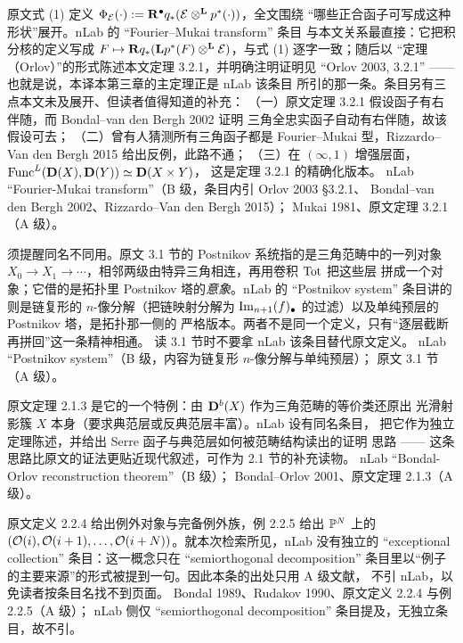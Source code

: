 \begin{conceptlist}
%
{原文式 (1) 定义 $\Phi_{\mathcal{E}}(\cdot):=\mathbf{R}^{\bullet} q_*(\mathcal{E}\otimes^{\mathbf{L}} p^*(\cdot))$，全文围绕
“哪些正合函子可写成这种形状”展开。nLab 的 “Fourier--Mukai transform” 条目
与本文关系最直接：它把积分核的定义写成
$F\mapsto \mathbf{R} q_*(\mathbf{L} p^*(F)\otimes^{\mathbf{L}} \mathcal{E})$，与式 (1) 逐字一致；随后以
“定理（Orlov）”的形式陈述本文定理 3.2.1，并明确注明证明见
“Orlov 2003, 3.2.1” —— 也就是说，本译本第三章的主定理正是 nLab 该条目
所引的那一条。条目另有三点本文未及展开、但读者值得知道的补充：
（一）原文定理 3.2.1 假设函子有右伴随，而 Bondal--van den Bergh 2002 证明
三角全忠实函子自动有右伴随，故该假设可去；
（二）曾有人猜测所有三角函子都是 Fourier--Mukai 型，Rizzardo--Van den Bergh
2015 给出反例，此路不通；
（三）在 $(\infty,1)$ 增强层面，$\mathrm{Func}^L(\mathbf{D}(X),\mathbf{D}(Y))\simeq \mathbf{D}(X\times Y)$，
这是定理 3.2.1 的精确化版本。}%
{nLab “Fourier-Mukai transform”（B 级，条目内引 Orlov 2003 §3.2.1、
Bondal--van den Bergh 2002、Rizzardo--Van den Bergh 2015）；
Mukai 1981、原文定理 3.2.1（A 级）。}

%
{须提醒同名不同用。原文 3.1 节的 Postnikov 系统指的是三角范畴中的一列对象
$X_0\to X_1\to\cdots$，相邻两级由特异三角相连，再用卷积 $\operatorname{Tot}$ 把这些层
拼成一个对象；它借的是拓扑里 Postnikov 塔的\emph{意象}。nLab 的
“Postnikov system” 条目讲的则是链复形的 $n$-像分解（把链映射分解为
$\operatorname{Im}_{n+1}(f)_\bullet$ 的过滤）以及单纯预层的 Postnikov 塔，是拓扑那一侧的
严格版本。两者不是同一个定义，只有“逐层截断再拼回”这一条精神相通。
读 3.1 节时不要拿 nLab 该条目替代原文定义。}%
{nLab “Postnikov system”（B 级，内容为链复形 $n$-像分解与单纯预层）；
原文 3.1 节（A 级）。}

%
{原文定理 2.1.3 是它的一个特例：由 $\mathbf{D}^{b}(X)$ 作为三角范畴的等价类还原出
光滑射影簇 $X$ 本身（要求典范层或反典范层丰富）。nLab 设有同名条目，
把它作为独立定理陈述，并给出 Serre 函子与典范层如何被范畴结构读出的证明
思路 —— 这条思路比原文的证法更贴近现代叙述，可作为 2.1 节的补充读物。}%
{nLab “Bondal-Orlov reconstruction theorem”（B 级）；
Bondal--Orlov 2001、原文定理 2.1.3（A 级）。}

%
{原文定义 2.2.4 给出例外对象与完备例外族，例 2.2.5 给出 $\mathbb{P}^N$ 上的
$(\mathcal{O}(i),\mathcal{O}(i+1),\dots,\mathcal{O}(i+N))$。就本次检索所见，nLab 没有独立的
“exceptional collection” 条目：这一概念只在 “semiorthogonal decomposition”
条目里以“例子的主要来源”的形式被提到一句。因此本条的出处只用 A 级文献，
不引 nLab，以免读者按条目名找不到页面。}%
{Bondal 1989、Rudakov 1990、原文定义 2.2.4 与例 2.2.5（A 级）；
nLab 侧仅 “semiorthogonal decomposition” 条目提及，无独立条目，故不引。}

\end{conceptlist}

